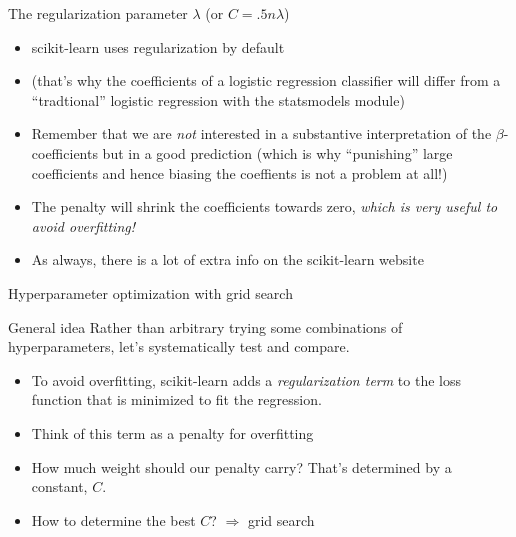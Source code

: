 \begin{frame}{The regularization parameter $\lambda$ (or $C = .5n\lambda$)}
\begin{itemize}[<+->]
\item scikit-learn uses regularization by default
\item (that's why the coefficients of a logistic regression classifier will differ from a ``tradtional'' logistic regression with the statsmodels module)
\item Remember that we are \textit{not} interested in a substantive interpretation of the  $\beta$-coefficients but in a good prediction (which is why ``punishing'' large coefficients and hence biasing the coeffients is not a problem at all!)
\item The penalty will shrink the coefficients towards zero, \emph{which is very useful to avoid overfitting!}
\item As always, there is a lot of extra info on the scikit-learn website
\end{itemize}
\end{frame}




\begin{frame}{Hyperparameter optimization with grid search}
  \begin{block}{General idea}
    Rather than arbitrary trying some combinations of hyperparameters, let's systematically test and compare.
  \end{block}
  
  \pause
  
  \begin{example}
    \begin{itemize}[<+->]
    \item To avoid overfitting, scikit-learn adds a \emph{regularization term} to the loss function that is minimized to fit the regression.
    \item Think of this term as a penalty for overfitting
    \item How much weight should our penalty carry? That's determined by a constant, $C$.
    \item How to determine the best $C$? $\Rightarrow$ grid search 
    \end{itemize}
  \end{example}
\end{frame}




